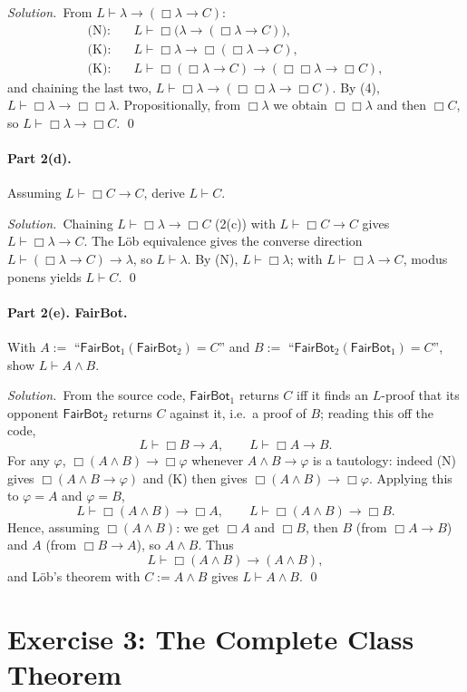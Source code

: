 \documentclass[11pt]{article}
\newcommand{\proves}{\vdash}
\newcommand{\FB}{\mathsf{FairBot}}
\newcommand{\bx}{\Box}
\theoremstyle{plain}
\newcommand{\soln}{\medskip\noindent\textit{Solution.}\ }
\begin{document}
\soln From $L\proves\lambda\to(\bx\lambda\to C)$:
\begin{align*}
\text{(N):}\quad & L\proves \bx\!\big(\lambda\to(\bx\lambda\to C)\big),\\
\text{(K):}\quad & L\proves \bx\lambda\to\bx(\bx\lambda\to C), \\
\text{(K):}\quad & L\proves \bx(\bx\lambda\to C)\to(\bx\bx\lambda\to\bx C),
\end{align*}
and chaining the last two, $L\proves\bx\lambda\to(\bx\bx\lambda\to\bx C)$. By (4), $L\proves\bx\lambda\to\bx\bx\lambda$. Propositionally, from $\bx\lambda$ we obtain $\bx\bx\lambda$ and then $\bx C$, so $L\proves\bx\lambda\to\bx C$. \qed

\paragraph{Part 2(d).} Assuming $L\proves\bx C\to C$, derive $L\proves C$.

\soln Chaining $L\proves\bx\lambda\to\bx C$ (2(c)) with $L\proves\bx C\to C$ gives $L\proves\bx\lambda\to C$. The L\"ob equivalence gives the converse direction $L\proves(\bx\lambda\to C)\to\lambda$, so $L\proves\lambda$. By (N), $L\proves\bx\lambda$; with $L\proves\bx\lambda\to C$, modus ponens yields $L\proves C$. \qed

\paragraph{Part 2(e). FairBot.} With $A:=$ ``$\FB_1(\FB_2)=C$'' and $B:=$ ``$\FB_2(\FB_1)=C$'', show $L\proves A\wedge B$.

\soln From the source code, $\FB_1$ returns $C$ iff it finds an $L$-proof that its opponent $\FB_2$ returns $C$ against it, i.e.\ a proof of $B$; reading this off the code,
\[
  L\proves \bx B\to A,\qquad L\proves \bx A\to B .
\]
For any $\varphi$, $\bx(A\wedge B)\to\bx\varphi$ whenever $A\wedge B\to\varphi$ is a tautology: indeed (N) gives $\bx(A\wedge B\to\varphi)$ and (K) then gives $\bx(A\wedge B)\to\bx\varphi$. Applying this to $\varphi=A$ and $\varphi=B$,
\[
  L\proves \bx(A\wedge B)\to\bx A,\qquad L\proves \bx(A\wedge B)\to\bx B.
\]
Hence, assuming $\bx(A\wedge B)$: we get $\bx A$ and $\bx B$, then $B$ (from $\bx A\to B$) and $A$ (from $\bx B\to A$), so $A\wedge B$. Thus
\[
  L\proves \bx(A\wedge B)\to(A\wedge B),
\]
and L\"ob's theorem with $C:=A\wedge B$ gives $L\proves A\wedge B$. \qed

\section{Exercise 3: The Complete Class Theorem}
\end{document}
